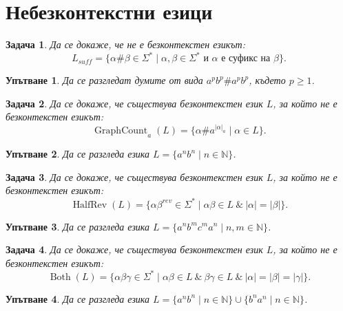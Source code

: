 \documentclass[12pt]{article}
\newtheorem{problem}{Задача}[section]
\newtheorem*{hint}{Упътване}
\theoremstyle{definition}
\begin{document}
\newpage

\section{Небезконтекстни езици}

\begin{problem}
Да се докаже, че не е безконтекстен езикът:
\[
    L_{suff} = \{ \alpha \# \beta \in \Sigma^* \mid \alpha, \beta \in \Sigma^* \text{ и } \alpha \text{ е суфикс на } \beta \}.
\]
\end{problem}

\begin{hint}
    Да се разгледат думите от вида $a^p b^p \# a^p b^p$, където $p \geq 1$.
\end{hint}

\begin{problem}
Да се докаже, че съществува безконтекстен език $L$, за който не е безконтекстен езикът:
\[
    \operatorname{GraphCount}_a(L) = \{ \alpha \# a^{|\alpha|_a} \mid \alpha \in L \}.
\]
\end{problem}

\begin{hint}
    Да се разгледа езика $L = \{ a^n b^n \mid n \in \mathbb{N} \}$.
\end{hint}

\begin{problem}
Да се докаже, че съществува безконтекстен език $L$, за който не е безконтекстен езикът:
\[
    \operatorname{HalfRev}(L) = \{ \alpha \beta^{rev} \in \Sigma^* \mid \alpha \beta \in L \: \& \: |\alpha| = |\beta| \}.
\]
\end{problem}

\begin{hint}
    Да се разгледа езика $L = \{ a^n b^m c^m a^n \mid n, m \in \mathbb{N} \}$.
\end{hint}

\begin{problem}
Да се докаже, че съществува безконтекстен език $L$, за който не е безконтекстен езикът:
\[
    \operatorname{Both}(L) = \{ \alpha \beta \gamma \in \Sigma^* \mid \alpha \beta \in L \: \& \: \beta \gamma \in L \: \& \: |\alpha| = |\beta| = |\gamma| \}.
\]
\end{problem}

\begin{hint}
    Да се разгледа езика $L = \{ a^n b^n \mid n \in \mathbb{N} \} \cup \{ b^n a^n \mid n \in \mathbb{N} \}$.
\end{hint}
\end{document}
